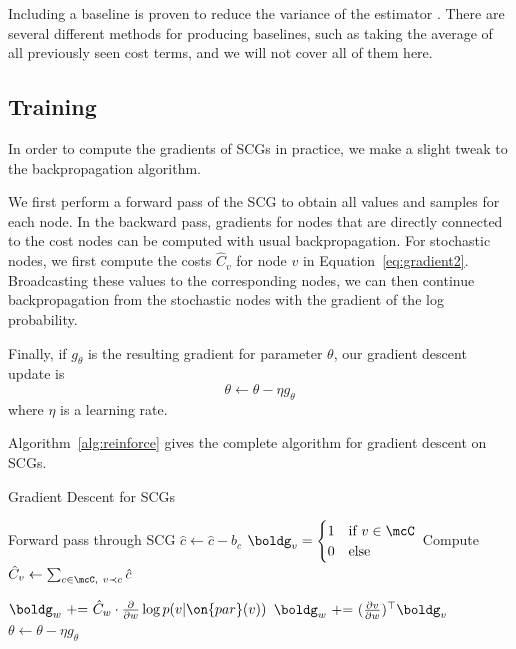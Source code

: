 \documentclass[12pt]{report}
\begin{document}
Including a baseline is proven to reduce the variance of the estimator \citep{Weaver2001}. There are several different methods for producing baselines, such as taking the average of all previously seen cost terms, and we will not cover all of them here.

\subsection{Training}
\label{sec:algorithm}

In order to compute the gradients of SCGs in practice, we make a slight tweak to the backpropagation algorithm.

We first perform a forward pass of the SCG to obtain all values and samples for each node. In the backward pass, gradients for nodes that are directly connected to the cost nodes can be computed with usual backpropagation. For stochastic nodes, we first compute the costs $\hat{C}_v$ for node $v$ in Equation~\ref{eq:gradient2}. Broadcasting these values to the corresponding nodes, we can then continue backpropagation from the stochastic nodes with the gradient of the log probability.

Finally, if $g_\theta$ is the resulting gradient for parameter $\theta$, our gradient descent update is
\begin{equation}
\theta \gets \theta  - \eta g_\theta
\end{equation}
where $\eta$ is a learning rate.

Algorithm~\ref{alg:reinforce} gives the complete algorithm for gradient descent on SCGs.



\begin{algorithm}
\caption{Gradient Descent for SCGs}
\label{alg:reinforce}
\begin{algorithmic}
\State Forward pass through SCG
\State $\hat{c} \gets \hat{c} - b_c$ 
\EndFor
{}
\State $\boldg_v = \begin{cases} 1 & \text{if $v \in \mcC$} \\ 0 & \text{else} \end{cases}$
\State Compute $\hat{C}_v \gets \sum_{c \in \mcC, ~v \prec c} \hat{c}$ 
\EndFor

	\State $\boldg_w \text{ += } \hat{C}_w \cdot \frac{\partial}{\partial w} \log p(v | \on{par}(v) ) $
\Else
	\State $\boldg_w \text{ += } (\frac{\partial v}{\partial w})^\top \boldg_v$
\EndIf
\EndIf
\EndFor
\EndFor
{}
\State $\theta \gets \theta - \eta g_\theta$ 
\EndFor
\end{algorithmic}
\end{algorithm}
\end{document}
